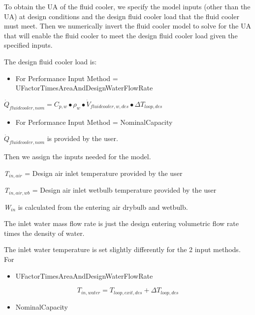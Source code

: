 To obtain the UA of the fluid cooler, we specify the model inputs (other than the UA) at design conditions and the design fluid cooler load that the fluid cooler must meet. Then we numerically invert the fluid cooler model to solve for the UA that will enable the fluid cooler to meet the design fluid cooler load given the specified inputs.

The design fluid cooler load is:

\begin{itemize}
\tightlist
\item
  For Performance Input Method = UFactorTimesAreaAndDesignWaterFlowRate
\end{itemize}

\({\dot Q_{fluidcooler,nom}} = {C_{p,w}} \bullet {\rho_w} \bullet {\dot V_{fluidcooler,w,des}} \bullet \Delta {T_{loop,des}}\)

\begin{itemize}
\tightlist
\item
  For Performance Input Method = NominalCapacity
\end{itemize}

\({\dot Q_{fluidcooler,nom}}\) is provided by the user.

Then we assign the inputs needed for the model.

\emph{T\(_{in,air}\)} = Design air inlet temperature provided by the user

\emph{T\(_{in,air,wb}\)} = Design air inlet wetbulb temperature provided by the user

\emph{W\(_{in}\)} is calculated from the entering air drybulb and wetbulb.

The inlet water mass flow rate is just the design entering volumetric flow rate times the density of water.

The inlet water temperature is set slightly differently for the 2 input methods. For

\begin{itemize}
\tightlist
\item
  UFactorTimesAreaAndDesignWaterFlowRate
\end{itemize}

\begin{equation}
{T_{in,water}} = {T_{loop,exit,des}} + \Delta {T_{loop,des}}
\end{equation}

\begin{itemize}
\tightlist
\item
  NominalCapacity
\end{itemize}


